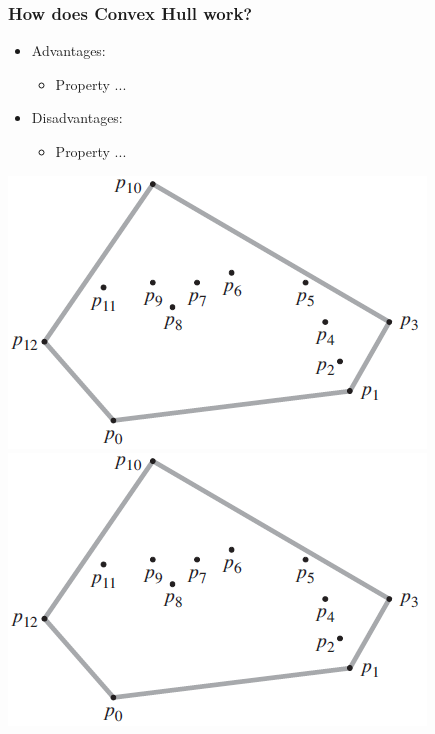 \begin{frame}
\frametitle{How does Convex Hull work?}
\begin{multicols}{2}
	\begin{itemize}
		\item Advantages:
		\begin{itemize}
			\item Property ...
		\end{itemize}
		\item Disadvantages:
		\begin{itemize}
			\item Property ...
		\end{itemize}
	\end{itemize}
\columnbreak
	\begin{center}
		\includegraphics[scale=0.5]{graphics/convexHull-example}\\
		\includegraphics[scale=0.5]{graphics/convexHull-example}
	\end{center}
\end{multicols}
\end{frame}